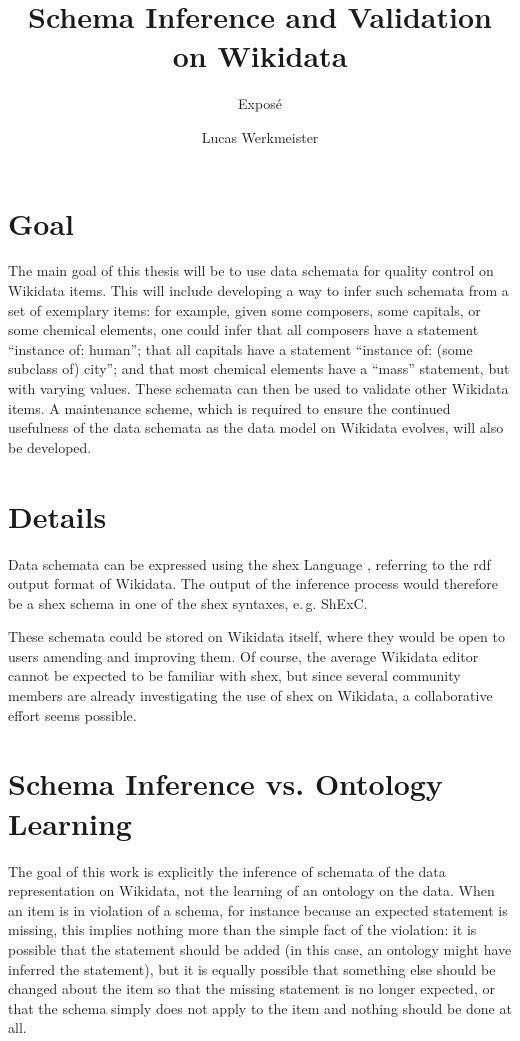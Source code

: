 \documentclass{scrartcl}
\title{Schema Inference and Validation on Wikidata}
\subtitle{Exposé}
\author{Lucas Werkmeister}
\begin{document}
\maketitle

\section{Goal}

The main goal of this thesis will be to use data schemata for quality control on Wikidata items.
This will include developing a way to infer such schemata from a set of exemplary items:
for example, given some composers, some capitals, or some chemical elements,
one could infer that all composers have a statement “instance of: human”;
that all capitals have a statement “instance of: (some subclass of) city”;
and that most chemical elements have a “mass” statement, but with varying values.
These schemata can then be used to validate other Wikidata items.
A maintenance scheme,
which is required to ensure the continued usefulness of the data schemata
as the data model on Wikidata evolves,
will also be developed.

\section{Details}

Data schemata can be expressed using the \gls{shex} Language \cite{Prud'hommeaux:2014:SER:2660517.2660523},
referring to the \gls{rdf} output format of Wikidata.
The output of the inference process would therefore be a \gls{shex} schema in one of the \gls{shex} syntaxes, e.\,g. ShExC.

These schemata could be stored on Wikidata itself,
where they would be open to users amending and improving them.
Of course, the average Wikidata editor cannot be expected to be familiar with \gls{shex},
but since several community members are already investigating the use of \gls{shex} on Wikidata,
a collaborative effort seems possible.

\section{Schema Inference vs. Ontology Learning}

The goal of this work is explicitly the inference of schemata of the data representation on Wikidata,
not the learning of an ontology on the data.
When an item is in violation of a schema,
for instance because an expected statement is missing,
this implies nothing more than the simple fact of the violation:
it is possible that the statement should be added
(in this case, an ontology might have inferred the statement),
but it is equally possible that something else should be changed about the item so that the missing statement is no longer expected,
or that the schema simply does not apply to the item and nothing should be done at all.
\end{document}
